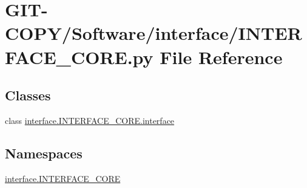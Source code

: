 \hypertarget{GIT-COPY_2Software_2interface_2INTERFACE__CORE_8py}{}\section{G\+I\+T-\/\+C\+O\+P\+Y/\+Software/interface/\+I\+N\+T\+E\+R\+F\+A\+C\+E\+\_\+\+C\+O\+R\+E.py File Reference}
\label{GIT-COPY_2Software_2interface_2INTERFACE__CORE_8py}
\subsection*{Classes}
\begin{DoxyCompactItemize}
\item 
class \hyperlink{classinterface_1_1INTERFACE__CORE_1_1interface}{interface.\+I\+N\+T\+E\+R\+F\+A\+C\+E\+\_\+\+C\+O\+R\+E.\+interface}
\end{DoxyCompactItemize}
\subsection*{Namespaces}
\begin{DoxyCompactItemize}
\item 
 \hyperlink{namespaceinterface_1_1INTERFACE__CORE}{interface.\+I\+N\+T\+E\+R\+F\+A\+C\+E\+\_\+\+C\+O\+R\+E}
\end{DoxyCompactItemize}

